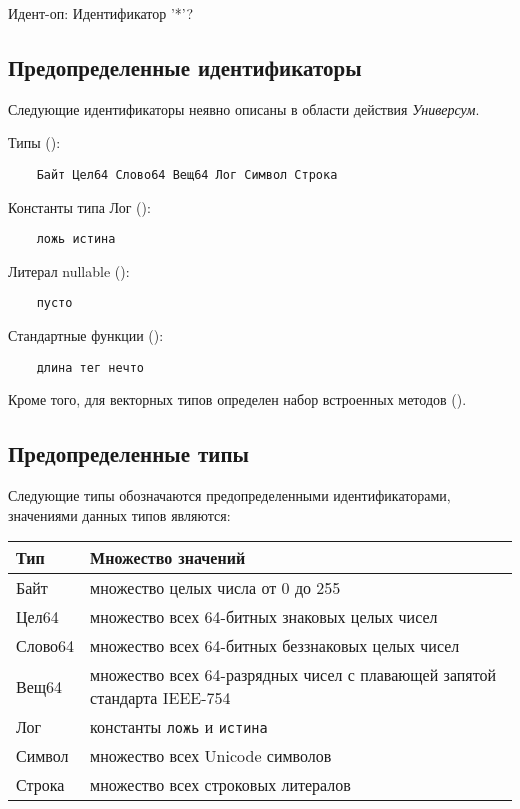 \begin{Grammar}
Идент-оп:  Идентификатор '*'?
\end{Grammar} 

\hypertarget{predefined-idents}{%
\subsection{Предопределенные идентификаторы}\label{decls:predefined-idents}}

Следующие идентификаторы неявно описаны в области действия \emph{Универсум}.
\bigskip

Типы ():
\begin{Verbatim}
    Байт Цел64 Слово64 Вещ64 Лог Символ Строка
\end{Verbatim}

Константы типа Лог ():
\begin{Verbatim}
    ложь истина
\end{Verbatim}

Литерал nullable ():
\begin{Verbatim}
    пусто
\end{Verbatim}

Стандартные функции ():
\begin{Verbatim}
    длина тег нечто
\end{Verbatim}

Кроме того, для векторных типов определен набор встроенных методов ().

\hypertarget{predefined-types}{%
\subsection{Предопределенные типы}\label{decls:predefined-types}}

Следующие типы обозначаются предопределенными идентификаторами, значениями данных типов являются:

\smallskip
\begin{tabular}[c]{l|l}
\textbf{Тип} & \textbf{Множество значений} \\ \hline
Байт &  множество целых числа от 0 до 255   \\
Цел64 & множество всех 64-битных знаковых целых чисел \\
Слово64 & множество всех 64-битных беззнаковых целых чисел  \\ 
Вещ64 & множество всех 64-разрядных чисел с плавающей запятой стандарта IEEE-754 \\ 
Лог & константы \verb|ложь| и \verb|истина| \\ 
Символ & множество всех Unicode символов \\ 
Строка & множество всех строковых литералов
\end{tabular}

